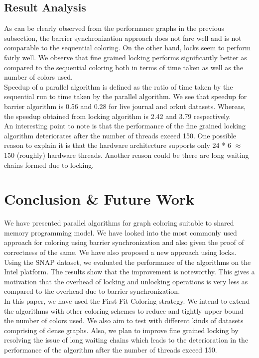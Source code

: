 \documentclass[a4paper,11pt]{article}
\begin{document}
\subsection{Result Analysis}
As can be clearly observed from the performance graphs in the previous subsection, the barrier synchronization approach does not fare well and is not comparable to the sequential coloring. On the other hand, locks seem to perform fairly well. We observe that fine grained locking performs significantly better as compared to the sequential coloring both in terms of time taken as well as the number of colors used.\\
\indent Speedup of a parallel algorithm is defined as the ratio of time taken by the sequential run to time taken by the parallel algorithm. We see that speedup for barrier algorithm is 0.56 and 0.28 for live journal and orkut datasets. Whereas, the speedup obtained from locking algorithm is 2.42 and 3.79 respectively.\\
\indent An interesting point to note is that the performance of the fine grained locking algorithm deteriorates after the number of threads exceed 150. One possible reason to explain it is that the hardware architecture supports only 24 * 6 $\approx$ 150 (roughly) hardware threads. Another reason could be there are long waiting chains formed due to locking. 
\vspace{-.2cm}
\section{Conclusion \& Future Work}
We have presented parallel algorithms for graph coloring suitable to shared memory programming model. We have looked into the most commonly used approach for coloring using barrier synchronization and also given the proof of correctness of the same. We have also proposed a new approach using locks. Using the SNAP dataset, we evaluated the performance of the algorithms on the Intel platform. The results show that the improvement is noteworthy. This gives a motivation that the overhead of locking and unlocking operations is very less as compared to the overhead due to barrier synchronization.\\
\indent In this paper, we have used the First Fit Coloring strategy. We intend to extend the algorithms with other coloring schemes to reduce and tightly upper bound the number of colors used. We also aim to test with different kinds of datasets comprising of dense graphs. Also, we plan to improve fine grained locking by resolving the issue of long waiting chains which leads to the deterioration in the performance of the algorithm after the number of threads exceed 150.
\vspace{-.3cm}


\end{document}

